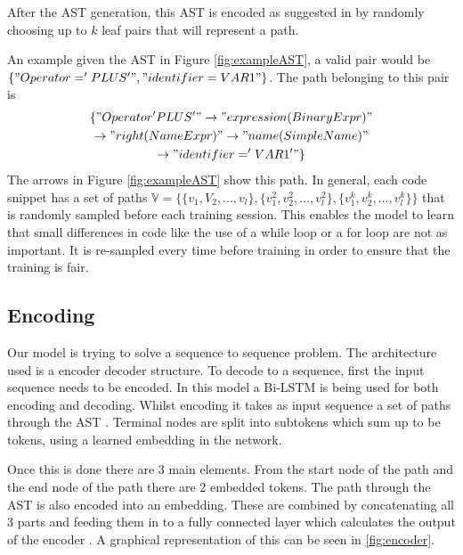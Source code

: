 \documentclass[a4paper,10pt]{article}
\theoremstyle{plain}
\theoremstyle{definition}
\begin{document}
\begin{multicols*}{2}

\label{code:examplefunction}


After the AST generation, this AST is encoded as suggested in \cite{alon2018code2seq} by randomly choosing up to $k$ leaf pairs that will represent a path. 

An example given the AST in Figure \ref{fig:exampleAST}, a valid pair would be $\{"Operator = 'PLUS'", "identifier=VAR1"\}$. The path belonging to this pair is 
\begin{multline}
\{"Operator 'PLUS'" \rightarrow "expression (BinaryExpr)" \\
\rightarrow "right(NameExpr)" \rightarrow "name(SimpleName)" \\
\rightarrow "identifier='VAR1'"\}
\end{multline}
The arrows in Figure \ref{fig:exampleAST} show this path. In general, each code snippet has a set of paths $\mathbb{V} = \{\{v_1,V_2,...,v_l\}, \{v^2_1, v^2_2,...,v^2_l\},\{v^k_1,v^k_2,...,v^k_l\}\}$ that is randomly sampled before each training session. This enables the model to learn that small differences in code like the use of a while loop or a for loop are not as important. It is re-sampled every time before training in order to ensure that the training is fair\cite{alon2018code2seq}.


\subsection{Encoding}
\label{Encoding}
Our model is trying to solve a sequence to sequence problem. The architecture used is a encoder decoder structure. To decode to a sequence, first the input sequence needs to be encoded. 
In this model a Bi-LSTM is being used for both encoding and decoding. Whilst encoding it takes as input sequence a set of paths through the AST \cite{alon2018code2seq}. Terminal nodes are split into subtokens which sum up to be tokens, using a learned embedding in the network. 

Once this is done there are 3 main elements. From the start node of the path and the end node of the path there are 2 embedded tokens. The path through the AST is also encoded into an embedding. These are combined by concatenating all 3 parts and feeding them in to a fully connected layer which calculates the output of the encoder \cite{alon2018code2seq}. A graphical representation of this can be seen in \ref{fig:encoder}.


\end{multicols*}
\end{document}
